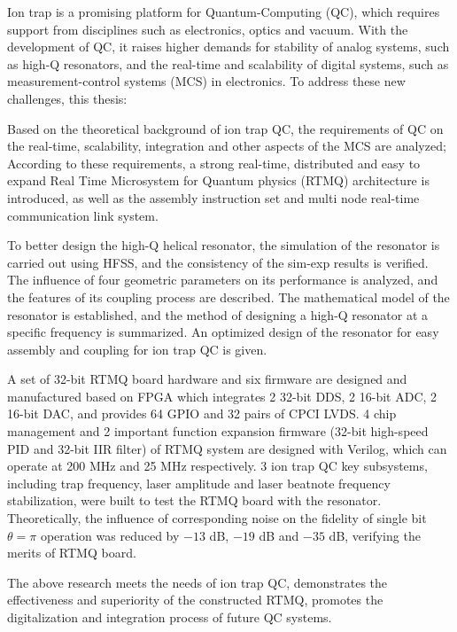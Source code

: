 \begin{abstract*}
  Ion trap is a promising platform for Quantum-Computing (QC), which requires support from disciplines such as electronics, optics and vacuum.
  With the development of QC, it raises higher demands for stability of analog systems, such as high-Q resonators, and the real-time and scalability of digital systems, such as measurement-control systems (MCS) in electronics. To address these new challenges, this thesis: 

  Based on the theoretical background of ion trap QC, the requirements of QC on the real-time, scalability, integration and other aspects of the MCS are analyzed; According to these requirements, a strong real-time, distributed and easy to expand Real Time Microsystem for Quantum physics (RTMQ) architecture is introduced, as well as the assembly instruction set and multi node real-time communication link system.

  To better design the high-Q helical resonator, the simulation of the resonator is carried out using HFSS, and the consistency of the sim-exp results is verified. The influence of four geometric parameters on its performance is analyzed, and the features of its coupling process are described. The mathematical model of the resonator is established, and the method of designing a high-Q resonator at a specific frequency is summarized. An optimized design of the resonator for easy assembly and coupling for ion trap QC is given.

  A set of 32-bit RTMQ board hardware and six firmware are designed and manufactured based on FPGA which integrates 2 32-bit DDS, 2 16-bit ADC, 2 16-bit DAC, and provides 64 GPIO and 32 pairs of CPCI LVDS. 4 chip management and 2 important function expansion firmware (32-bit high-speed PID and 32-bit IIR filter) of RTMQ system are designed with Verilog, which can operate at 200 MHz and 25 MHz respectively. 3 ion trap QC key subsystems, including trap frequency, laser amplitude and laser beatnote frequency stabilization, were built to test the RTMQ board with the resonator. Theoretically, the influence of corresponding noise on the fidelity of single bit $\theta=\pi$ operation was reduced by $-13$ dB, $-19$ dB and $-35$ dB, verifying the merits of RTMQ board.
  
  The above research meets the needs of ion trap QC, demonstrates the effectiveness and superiority of the constructed RTMQ, promotes the digitalization and integration process of future QC systems.


\end{abstract*}

